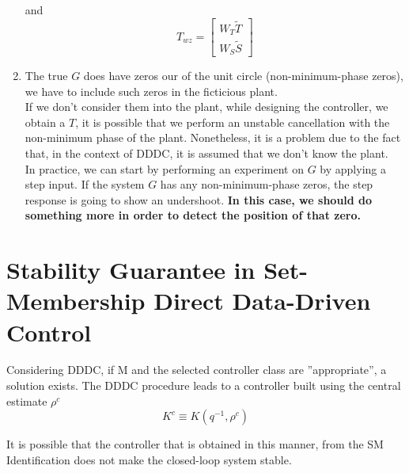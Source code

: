 \begin{enumerate}
\begin{example}
\[ \]
 and 
 \[
 T_{wz} = 
 \begin{bmatrix}
 W_T\tilde{T}\\
 W_S\tilde{S}
 \end{bmatrix}
 \]
    \end{example}
    \item The true $G$ does have zeros our of the unit circle (non-minimum-phase zeros), we have to include such zeros in the ficticious plant.\\
    If we don't consider them into the plant, while designing the controller, we obtain a $T$, it is possible that we perform an unstable cancellation with the non-minimum phase of the plant. Nonetheless,  it is a problem due to the fact that, in the context of DDDC, it is assumed that we don't know the plant.\\
    In practice, we can start by performing an experiment on $G$ by applying a step input. If the system $G$ has any non-minimum-phase zeros, the step response is going to show an undershoot. \textbf{In this case, we should do something more in order to detect the position of that zero.}
\end{enumerate}



 
 




























\section{Stability Guarantee in Set-Membership Direct Data-Driven Control}

Considering DDDC, if M and the selected controller class are ”appropriate”, a solution exists.
The DDDC procedure leads to a controller built using the central estimate $\rho^c$
\[
K^c \equiv K(q^{-1},\rho^c)
\]

It is possible that the controller that is obtained in this manner, from the SM Identification does not make the closed-loop system stable.

